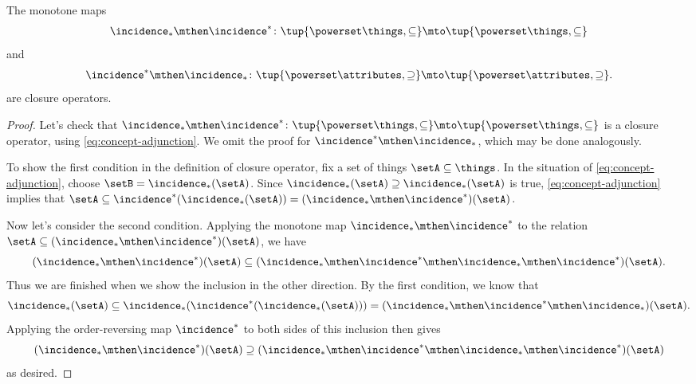 \begin{lemma}\label{lem:cfa-closure-operators}
The monotone maps 
\begin{equation}
\incidence_* \mthen \incidence^* \colon \tup{\powerset \things, \subseteq} \mto \tup{\powerset \things, \subseteq}
\end{equation}
and 
\begin{equation}
\incidence^* \mthen \incidence_* \colon \tup{\powerset \attributes, \supseteq} \mto \tup{\powerset \attributes, \supseteq}.
\end{equation}
are closure operators. 
\end{lemma}

\begin{proof}
Let's check that $\incidence_* \mthen \incidence^* \colon \tup{\powerset \things, \subseteq} \mto \tup{\powerset \things, \subseteq}$ is a closure operator, using \cref{eq:concept-adjunction}. We omit the proof for $\incidence^* \mthen \incidence_*$, which may be done analogously. 


To show the first condition in the definition of closure operator, fix a set of things $\setA \subseteq \things$. In the situation of \cref{eq:concept-adjunction}, choose $\setB = \incidence_*(\setA)$. Since $\incidence_*(\setA) \supseteq \incidence_*(\setA)$ is true, \cref{eq:concept-adjunction} implies that $\setA \subseteq \incidence^*(\incidence_*(\setA))  = (\incidence_* \mthen \incidence^*)(\setA)$. 

Now let's consider the second condition. Applying the monotone map $\incidence_* \mthen \incidence^*$ to the relation $\setA \subseteq (\incidence_* \mthen \incidence^*)(\setA)$, we have
\begin{equation}
(\incidence_* \mthen \incidence^*)(\setA)  \subseteq  (\incidence_* \mthen \incidence^* \mthen \incidence_* \mthen \incidence^*)(\setA).
\end{equation}
Thus we are finished when we show the inclusion in the other direction. By the first condition, we know that 
\begin{equation}
\incidence_*(\setA) \subseteq \incidence_*( \incidence^* (\incidence_*(\setA))) = (\incidence_* \mthen \incidence^* \mthen \incidence_*)(\setA).
\end{equation}
Applying the order-reversing map $\incidence^*$ to both sides of this inclusion then gives 
\begin{equation}
(\incidence_* \mthen \incidence^*)(\setA) \supseteq (\incidence_* \mthen \incidence^* \mthen \incidence_* \mthen \incidence^*)(\setA)
\end{equation}
as desired. 
\end{proof}

